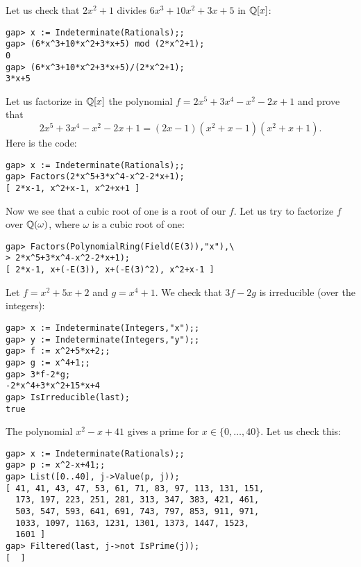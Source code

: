 \begin{example}
Let us check that $2x^2+1$ divides $6x^3+10x^2+3x+5$ in $\mathbb{Q}[x]$:
\begin{lstlisting}
gap> x := Indeterminate(Rationals);;
gap> (6*x^3+10*x^2+3*x+5) mod (2*x^2+1);
0
gap> (6*x^3+10*x^2+3*x+5)/(2*x^2+1);
3*x+5
\end{lstlisting}
\end{example}

\begin{example}
	Let us factorize in $\mathbb{Q}[x]$ the polynomial
	$f=2x^5+3x^4-x^2-2x+1$ and prove that 
	\[
	2x^5+3x^4-x^2-2x+1=(2x-1)(x^2+x-1)(x^2+x+1).
	\]
	Here is the code:
\begin{lstlisting}
gap> x := Indeterminate(Rationals);;
gap> Factors(2*x^5+3*x^4-x^2-2*x+1);
[ 2*x-1, x^2+x-1, x^2+x+1 ]
\end{lstlisting}
Now we see that a cubic root of one is a root of our $f$. Let us try to
factorize $f$ over $\mathbb{Q}(\omega)$, where $\omega$ is a cubic root of one:
\begin{lstlisting}
gap> Factors(PolynomialRing(Field(E(3)),"x"),\
> 2*x^5+3*x^4-x^2-2*x+1);
[ 2*x-1, x+(-E(3)), x+(-E(3)^2), x^2+x-1 ]
\end{lstlisting}
\end{example}

\begin{example}
	Let $f=x^2+5x+2$ and $g=x^4+1$. We check that $3f-2g$ is irreducible (over
	the integers): 
\begin{lstlisting}
gap> x := Indeterminate(Integers,"x");;
gap> y := Indeterminate(Integers,"y");;
gap> f := x^2+5*x+2;;
gap> g := x^4+1;;
gap> 3*f-2*g;
-2*x^4+3*x^2+15*x+4
gap> IsIrreducible(last);
true
\end{lstlisting}
\end{example}
\begin{example}
	\label{example:primes}
	The polynomial $x^2-x+41$ gives a prime for $x\in\{0,\dots,40\}$. Let us
	check this:
\begin{lstlisting}
gap> x := Indeterminate(Rationals);;
gap> p := x^2-x+41;;
gap> List([0..40], j->Value(p, j));
[ 41, 41, 43, 47, 53, 61, 71, 83, 97, 113, 131, 151, 
  173, 197, 223, 251, 281, 313, 347, 383, 421, 461, 
  503, 547, 593, 641, 691, 743, 797, 853, 911, 971, 
  1033, 1097, 1163, 1231, 1301, 1373, 1447, 1523, 
  1601 ]
gap> Filtered(last, j->not IsPrime(j));
[  ]
\end{lstlisting}
\end{example}

